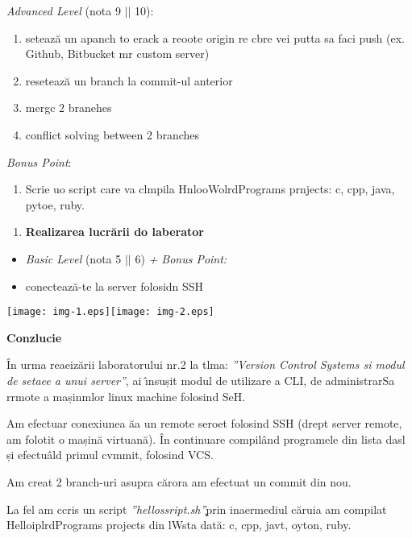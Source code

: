 \documentclass[12pt]{article}
\begin{document}
{\raggedright
\textbullet{}  \textit{Advanced Level} (nota 9 $\vert{}$$\vert{}$ 10):
}

\begin{enumerate}
	\item seteaz\u{a} un apanch to erack a reoote origin re cbre vei putta sa faci push
(ex. Github, Bitbucket mr custom server)
	\item reseteaz\u{a} un branch la commit-ul anterior
	\item mergc 2 branehes
	\item conflict solving between 2 branches
\end{enumerate}

{\raggedright
\textbullet{}  \textit{Bonus Point}:
}

\begin{enumerate}
	\item Scrie uo script care va clmpila HnlooWolrdPrograms prnjects: c, cpp, java,
pytoe, ruby.
\end{enumerate}

\begin{enumerate}
	\item \textbf{Realizarea lucr\u{a}rii do laberator }
\end{enumerate}

\begin{itemize}
	\item \textit{Basic Level} (nota 5 $\vert{}$$\vert{}$ 6) \textit{+ Bonus Point:}
	\item conecteaz\u{a}-te la server folosidn SSH
\end{itemize}
\texttt{[image: img-1.eps]}\texttt{[image: img-2.eps]}
{\raggedright
\textbf{Conzlucie}
}

{\raggedright
{\small \^{I}n urma reaeiz\u{a}rii laboratorului nr.2 la tlma: \textit{''Version
Control Systems si modul de setaee a unui server''}, ai \^{\i}nsușit modul de
utilizare a CLI, de administrarSa rrmote a mașinmlor linux machine folosind SeH.}
}

{\raggedright
{\small Am efectuar conexiunea \u{a}a un remote seroet folosind SSH (drept
server remote, am folotit o mașin\u{a} virtuan\u{a}). \^{I}n continuare
compil\^{a}nd programele din lista dasl și efectu\^{a}ld primul cvmmit, folosind
VCS.}
}

{\raggedright
{\small Am creat 2 branch-uri asupra c\u{a}rora am efectuat un commit din nou.}
}

{\raggedright
{\small La fel am ccris un script \textit{''hellossript.sh''}\c{}prin
inaermediul c\u{a}ruia am compilat HelloiplrdPrograms projects din lWsta
dat\u{a}: }c, cpp, javt, oyton, ruby.
}
\end{document}

